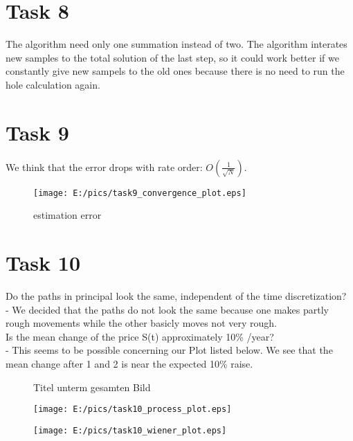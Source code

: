 \documentclass{article}
\begin{document}
\section*{Task 8}
The algorithm need only one summation instead of two. The algorithm interates new samples to the total solution of the last step, so it could work better if we constantly give new sampels to the old ones because there is no need to run the hole calculation again. 

\newpage
\section*{Task 9}
We think that the error drops with rate order: $O\left(\frac{1}{\sqrt{N}}\right)$.
\begin{figure}[htbp]
	\centering
		\texttt{[image: E:/pics/task9\_convergence\_plot.eps]}
	\caption{estimation error}
	\label{fig:task9_convergence_plot}
\end{figure}

\section*{Task 10}
Do the paths in principal look the same, independent of the time discretization?\\
- We decided that the paths do not look the same because one makes partly rough movements while the other basicly moves not very rough.\\
Is the mean change of the price S(t) approximately 10\% /year?\\
- This seems to be possible concerning our Plot listed below. We see that the mean change after 1 and 2 is near the expected 10\% raise.

\begin{figure} 
\caption{Titel unterm gesamten Bild} 
\end{figure} 

\begin{figure}[htbp]
	\centering
		\texttt{[image: E:/pics/task10\_process\_plot.eps]}
	\label{fig:task10_process_plot}
\end{figure}
\begin{figure}[htbp]
	\centering
		\texttt{[image: E:/pics/task10\_wiener\_plot.eps]}
	\label{fig:task10_wiener_plot}
\end{figure}
\end{document}
